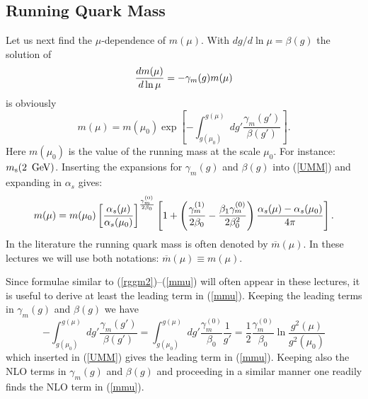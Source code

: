 \documentclass[12pt,rotate]{article}
\def\as{\alpha_s}
\newcommand{\ms}{m_{\rm s}}
\newcommand{\gev}{\, {\rm GeV}}
\newcommand{\be}{\begin{equation}}
\newcommand{\ee}{\end{equation}}
\begin{document}
\begin{itemize}
\begin{itemize}
\subsection{Running Quark Mass}
Let us next find the $\mu$-dependence of $m(\mu)$. With
$dg/d\ln\mu=\beta(g)$ the solution of
\begin{equation}\label{rggm2}
{d m(\mu)\over d\ln\mu}=-\gamma_m(g) m(\mu)  
\end{equation}
is obviously
\begin{equation}\label{UMM}
 m(\mu) = m(\mu_0) \exp \left[ 
  - \int_{g(\mu_0)}^{g(\mu)}{dg' \frac{\gamma_m(g')}{\beta(g')}}\right]. 
\end{equation}
Here
$m(\mu_0)$ is the
value of the running mass at the scale $\mu_0$. For instance:
$\ms(2~\gev)$. 
Inserting the expansions for $\gamma_m(g)$ and $\beta(g)$ into (\ref{UMM}) 
and expanding in $\as$ gives:
\begin{equation}\label{mmu}
m(\mu)=
m(\mu_0)
\left[{\as(\mu)\over\as(\mu_0)}\right]^{\gamma^{(0)}_m\over 2\beta_0}
\left[1+\left({\gamma^{(1)}_{m}\over 2\beta_0}-{\beta_1\gamma^{(0)}_{m}\over
  2\beta^2_0}\right){\as(\mu)-\as(\mu_0)\over 4\pi}\right].
\end{equation}
In the literature the running quark mass is often denoted by
$\overline{m}(\mu)$. In these lectures we will use both notations:
$\overline{m}(\mu)\equiv {m}(\mu)$.

Since formulae similar to (\ref{rggm2})--(\ref{mmu}) will
often appear in these lectures, it is useful to derive at least the
leading term in (\ref{mmu}).
Keeping the leading terms in $\gamma_m(g)$ and $\beta(g)$ we have
\be
  - \int_{g(\mu_0)}^{g(\mu)} dg' \frac{\gamma_m(g')}{\beta(g')}
  = \int_{g(\mu_0)}^{g(\mu)} dg' \frac{\gamma_m^{(0)}}{\beta_0}
    \frac{1}{g'}=\frac{1}{2} \frac{\gamma_m^{(0)}}{\beta_0}
    \ln\frac{g^2(\mu)}{g^2(\mu_0)}
\ee
which inserted in (\ref{UMM}) gives the leading term in (\ref{mmu}).
Keeping also the NLO terms in $\gamma_m(g)$ and $\beta(g)$ and
proceeding in a similar manner one readily finds the NLO term
in (\ref{mmu}).


\end{itemize}
\end{itemize}
\end{document}
